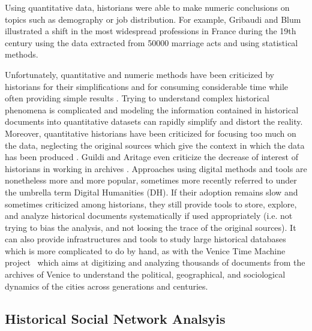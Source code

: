 Using quantitative data, historians were able to make numeric conclusions on topics such as demography \cite{henryRegistresParoissiauxHistoire1956} or job distribution.
For example, Gribaudi and Blum illustrated a shift in the most widespread professions in France during the 19th century using the data extracted from 50000 marriage acts \cite{gribaudi1990} and using statistical methods.

Unfortunately, quantitative and numeric methods have been criticized by historians for their simplifications and for consuming considerable time while often providing simple results \cite{karila-cohenNouvellesCuisinesHistoire2018,lepetitHistoireQuantitativeDeux1989}.
Trying to understand complex historical phenomena is complicated and modeling the information contained in historical documents into quantitative datasets can rapidly simplify and distort the reality.
Moreover, quantitative historians have been criticized for focusing too much on the data, neglecting the original sources which give the context in which the data has been produced \cite{lemercierQuantitativeMethodsHumanities2019}.
Guildi and Aritage even criticize the decrease of interest of historians in working in archives \cite{guldiHistoryManifesto2014}.
Approaches using digital methods and tools are nonetheless more and more popular, sometimes more recently referred to under the umbrella term Digital Humanities (DH).
If their adoption remains slow and sometimes criticized among historians, they still provide tools to store, explore, and analyze historical documents systematically if used appropriately (i.e. not trying to bias the analysis, and not loosing the trace of the original sources).
It can also provide infrastructures and tools to study large historical databases which is more complicated to do by hand, as with the Venice Time Machine project~\cite{kaplanVeniceTimeMachine2015} which aims at digitizing and analyzing thousands of documents from the archives of Venice to understand the political, geographical, and sociological dynamics of the cities across generations and centuries.


\subsection{Historical Social Network Analsyis}\label{subsec:historical-social-network-analsyis}

